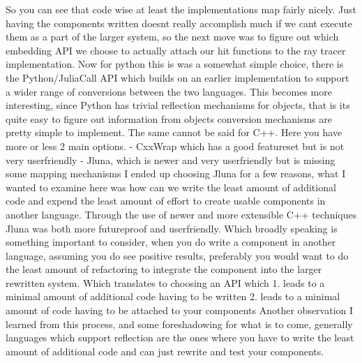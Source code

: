 {}\markdownRendererInterblockSeparator
{}\markdownRendererInterblockSeparator
{}So you can see that code wise at least the implementations map fairly nicely.\markdownRendererInterblockSeparator
{}\markdownRendererInterblockSeparator
{}Just having the components written doesnt really accomplish much if we cant execute them as a part of the larger system, so the next move was to figure out which embedding API we choose to actually attach our hit functions to the ray tracer implementation. \markdownRendererInterblockSeparator
{}\markdownRendererInterblockSeparator
{}Now for python this is was a somewhat simple choice, there is the Python/JuliaCall API which builds on an earlier implementation to support a wider range of conversions between the two languages. \markdownRendererInterblockSeparator
{}\markdownRendererInterblockSeparator
{}This becomes more interesting, since Python has trivial reflection mechanisms for objects, that is its quite easy to figure out information from objects conversion mechanisms are pretty simple to implement. The same cannot be said for C++. Here you have more or less 2 main options. - CxxWrap which has a good featureset but is not very userfriendly - Jluna, which is newer and very userfriendly but is missing some mapping mechanisms \markdownRendererInterblockSeparator
{}I ended up choosing Jluna for a few reasons, what I wanted to examine here was how can we write the least amount of additional code and expend the least amount of effort to create usable components in another language. Through the use of newer and more extensible C++ techniques Jluna was both more futureproof and userfriendly.\markdownRendererInterblockSeparator
{}Which broadly speaking is something important to consider, when you do write a component in another language, assuming you do see positive results, preferably you would want to do the least amount of refactoring to integrate the component into the larger rewritten system. Which translates to choosing an API which 1. leads to a minimal amount of additional code having to be written 2. leads to a minimal amount of code having to be attached to your components \markdownRendererInterblockSeparator
{}Another observation I learned from this process, and some foreshadowing for what is to come, generally languages which support reflection are the ones where you have to write the least amount of additional code and can just rewrite and test your components.\markdownRendererInterblockSeparator
